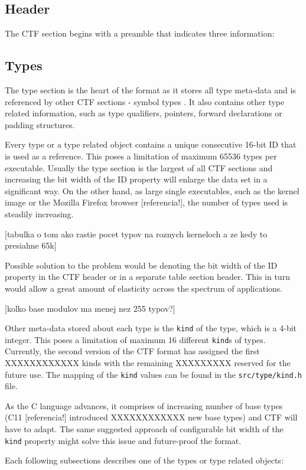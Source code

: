 \subsection{Header}
The CTF section begins with a preamble that indicates three information: 

\subsection{Types}
The type section is the heart of the format as it stores all type meta-data and
is referenced by other CTF sections - symbol types . It also contains other
type related information, such as type qualifiers, pointers, forward
declarations or padding structures.

Every type or a type related object contains a unique consecutive 16-bit ID
that is used as a reference. This poses a limitation of maximum 65536 types per
executable. Usually the type section is the largest of all CTF sections and
increasing the bit width of the ID property will enlarge the data set in a
significant way. On the other hand, as large single executables, such as the
kernel image or the Mozilla Firefox browser [referencia!], the number of types
used is steadily increasing.

[tabulka o tom ako rastie pocet typov na roznych kerneloch a ze kedy to
presiahne 65k]

Possible solution to the problem would be denoting the bit width of the ID
property in the CTF header or in a separate table section header. This in turn
would allow a great amount of elasticity across the spectrum of applications. 

[kolko base modulov ma menej nez 255 typov?]

Other meta-data stored about each type is the \texttt{kind} of the type, which
is a 4-bit integer. This poses a limitation of maximum 16 different
\texttt{kind}s of types. Currently, the second version of the CTF format has
assigned the first XXXXXXXXXXXX kinds with the remaining XXXXXXXXX reserved for
the future use. The mapping of the \texttt{kind} values can be found in the
\texttt{src/type/kind.h} file.

As the C language advances, it comprises of increasing number
of base types (C11 [referencia!] introduced XXXXXXXXXXXX new base types) and
CTF will have to adapt. The same suggested approach of configurable bit width
of the \texttt{kind} property might solve this issue and future-proof the
format.

Each following subsections describes one of the types or type related objects:

